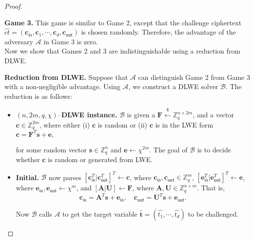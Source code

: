 \documentclass[runningheads,10pt]{llncs}
\begin{document}
\begin{proof}
\begin{description}
		\item  \textbf{Game 3.} This game is similar to Game 2, 
		except that the challenge ciphertext $\widehat{ct}=(\textbf{c}_{\textsf{in}}, \textbf{c}_1, \cdots, \textbf{c}_{d}, \textbf{c}_{\textsf{out}})$ is chosen randomly. 
		Therefore, the advantage of the adversary $\mathcal{A}$ in Game 3 is zero.\\
		Now we show that Games 2 and 3 are indistinguishable using a reduction from DLWE.
		
		\item \textbf{Reduction from DLWE.} Suppose that $\mathcal{A}$ can distinguish Game 2 from Game 3 
		with a non-negligible advantage. 
		Using $\mathcal{A}$, we construct a DLWE solver $\mathcal{B}$. The reduction is as follows:
		\begin{itemize}
			\item $(n,2m,q,\chi)$--\textbf{DLWE instance.} $\mathcal{B}$ is given a
			$\textbf{F} \xleftarrow{\$}\mathbb{Z}_q^{n \times 2m}$, and a vector $\mathbf{c}\in \mathbb{Z}_q^{2m}$,
			where  either (i) $\textbf{c}$ is random or 
			(ii) $\textbf{c}$ is in the LWE form
			$\textbf{c}=\textbf{F}^T \textbf{s}+\textbf{e},$
			
			for some random vector $\textbf{s}\in \mathbb{Z}_q^{n}$ and $\textbf{e} \leftarrow \chi^{2m}$. 
			The goal of $\mathcal{B}$ is to decide whether  $\textbf{c}$ is random or generated from LWE.
			
			\item \textbf{Initial.} $\mathcal{B}$ now parses   $[\mathbf{c}_{\textsf{in}}^T|\mathbf{c}_{\textsf{out}}^T]^T \leftarrow \mathbf{c}$, where $\mathbf{c}_{\textsf{in}}, \mathbf{c}_{\textsf{out}}\in \mathbb{Z}_q^{m}$, $[\mathbf{e}_{\textsf{in}}^T|\mathbf{e}_{\textsf{out}}^T]^T \leftarrow \mathbf{e}$, where $\mathbf{e}_{\textsf{in}}, \mathbf{e}_{\textsf{out}}\leftarrow \chi^{m}$, and  $[\mathbf{A} |\mathbf{U}] \leftarrow \mathbf{F}$, where $\mathbf{A}, \textbf{U}\in \mathbb{Z}_q^{n \times m}$. That is,
			\begin{equation}\label{key89}
			\textbf{c}_{\textsf{in}}=\textbf{A}^T \textbf{s}+\textbf{e}_{\textsf{in}},	 \quad \textbf{c}_{\textsf{out}}=\textbf{U}^T \textbf{s}+\textbf{e}_{\textsf{out}}.
			\end{equation}
			
			Now
			$\mathcal{B}$ calls $\mathcal{A}$ to get the target variable $\widehat{\mathbf{t}}=(\widehat{t_1}, \cdots, \widehat{t_d})$ to be challenged.
			
			
			

\end{itemize}
\end{description}
\end{proof}
\end{document}
